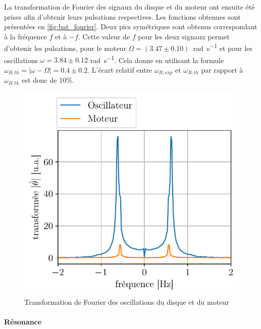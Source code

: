 La transformation de Fourier des signaux du disque et du moteur ont ensuite été prises afin d'obtenir leurs pulsations respectives. Les fonctions obtenues sont présentées en \autoref{fig:bat_fourier}. Deux pics symétriques sont obtenus correspondant à la fréquence $f$ et à $-f$. Cette valeur de $f$ pour les deux signaux permet d'obtenir les pulsations, pour le moteur \hbox{$\Omega = (3.47\pm0.10)$ \si{\radian\per\second}} et pour les oscillations $\omega = 3.84\pm0.12$ \si{\radian\per\second}. Cela donne en utilisant la formule \hbox{\(\omega_{B,th} = |\omega- \Omega| = 0.4\pm0.2\)}. L'écart relatif entre $\omega_{B,exp}$ et $\omega_{B,th}$ par rapport à $\omega_{B,th}$ est donc de 10\%.
\begin{figure}
    \centering
    \includegraphics[width=\linewidth]{figures/bat_fourier.pdf}
    \caption{Transformation de Fourier des oscillations du disque et du moteur}
    \label{fig:bat_fourier}
    \vspace*{-0.5cm}
\end{figure}


\paragraph{Résonance}


